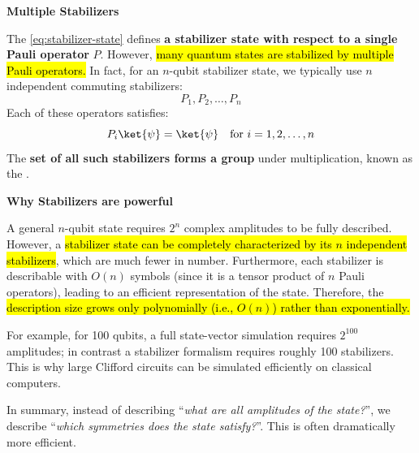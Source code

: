 \highspace
\begin{flushleft}
    \textcolor{Green3}{ \textbf{Multiple Stabilizers}}
\end{flushleft}
The \autoref{eq:stabilizer-state} defines \textbf{a stabilizer state with respect to a single Pauli operator} $P$. However, \hl{many quantum states are stabilized by multiple Pauli operators.} In fact, for an $n$-qubit stabilizer state, we typically use $n$ independent commuting stabilizers:
\begin{equation*}
    P_1, P_2, \dots, P_n
\end{equation*}
Each of these operators satisfies:
\begin{equation}
    P_i\ket{\psi} = \ket{\psi} \quad \text{for } i = 1, 2, \dots, n
\end{equation}
The \textbf{set of all such stabilizers forms a group} under multiplication, known as the .

\highspace
\begin{flushleft}
    \textcolor{Green3}{ \textbf{Why Stabilizers are powerful}}
\end{flushleft}
A general $n$-qubit state requires $2^n$ complex amplitudes to be fully described. However, a \hl{stabilizer state can be completely characterized by its $n$ independent stabilizers}, which are much fewer in number. Furthermore, each stabilizer is describable with $O(n)$ symbols (since it is a tensor product of $n$ Pauli operators), leading to an efficient representation of the state. Therefore, the \hl{description size grows only polynomially (i.e., $O(n)$) rather than exponentially.}

\highspace
For example, for 100 qubits, a full state-vector simulation requires $2^{100}$ amplitudes; in contrast a stabilizer formalism requires roughly 100 stabilizers. This is why large Clifford circuits can be simulated efficiently on classical computers.

\highspace
In summary, instead of describing ``\emph{what are all amplitudes of the state?}'', we describe ``\emph{which symmetries does the state satisfy?}''. This is often dramatically more efficient.